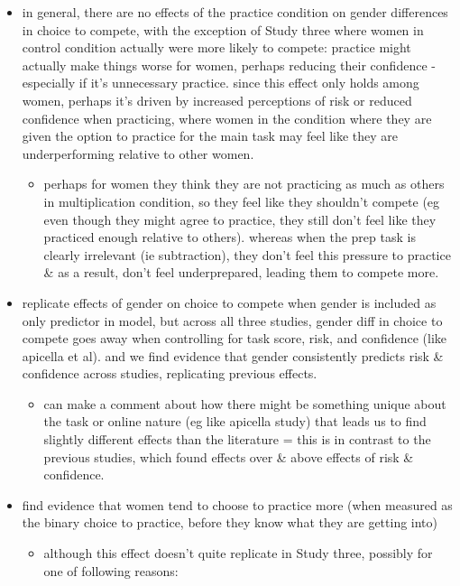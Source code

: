 \documentclass[a4paper, nobind]{templates/ociamthesis}
\providecommand{\tightlist}{%
  \setlength{\itemsep}{0pt}\setlength{\parskip}{0pt}}
\begin{document}
\begin{itemize}
\tightlist
\item
  in general, there are no effects of the practice condition on gender differences in choice to compete, with the exception of Study three where women in control condition actually were more likely to compete: practice might actually make things worse for women, perhaps reducing their confidence - especially if it's unnecessary practice. since this effect only holds among women, perhaps it's driven by increased perceptions of risk or reduced confidence when practicing, where women in the condition where they are given the option to practice for the main task may feel like they are underperforming relative to other women.

  \begin{itemize}
  \tightlist
  \item
    perhaps for women they think they are not practicing as much as others in multiplication condition, so they feel like they shouldn't compete (eg even though they might agree to practice, they still don't feel like they practiced enough relative to others). whereas when the prep task is clearly irrelevant (ie subtraction), they don't feel this pressure to practice \& as a result, don't feel underprepared, leading them to compete more.
  \end{itemize}
\item
  replicate effects of gender on choice to compete when gender is included as only predictor in model, but across all three studies, gender diff in choice to compete goes away when controlling for task score, risk, and confidence (like apicella et al). and we find evidence that gender consistently predicts risk \& confidence across studies, replicating previous effects.

  \begin{itemize}
  \tightlist
  \item
    can make a comment about how there might be something unique about the task or online nature (eg like apicella study) that leads us to find slightly different effects than the literature = this is in contrast to the previous studies, which found effects over \& above effects of risk \& confidence.
  \end{itemize}
\item
  find evidence that women tend to choose to practice more (when measured as the binary choice to practice, before they know what they are getting into)

  \begin{itemize}
  \tightlist
  \item
    although this effect doesn't quite replicate in Study three, possibly for one of following reasons:


\end{itemize}
\end{itemize}
\end{document}
